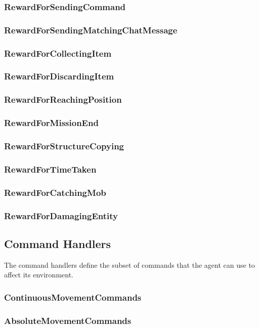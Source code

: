 \documentclass[11pt]{article} %
\begin{document}
\subsubsection{RewardForSendingCommand}
\subsubsection{RewardForSendingMatchingChatMessage}
\subsubsection{RewardForCollectingItem}
\subsubsection{RewardForDiscardingItem}
\subsubsection{RewardForReachingPosition}
\subsubsection{RewardForMissionEnd}
\subsubsection{RewardForStructureCopying}
\subsubsection{RewardForTimeTaken}
\subsubsection{RewardForCatchingMob}
\subsubsection{RewardForDamagingEntity}

\subsection{Command Handlers}
The command handlers define the subset of commands that the agent can use to affect its environment.

\subsubsection{ContinuousMovementCommands}
\subsubsection{AbsoluteMovementCommands}
\end{document}

